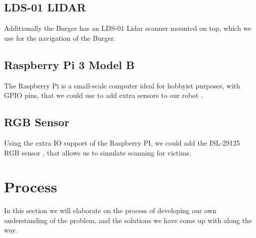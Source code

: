\documentclass[conference]{IEEEtran}
\begin{document}
\subsection{LDS-01 LIDAR}
Additionally the Burger has an LDS-01\cite{b2} Lidar scanner mounted on top, which we use for the navigation of the Burger.\\


\subsection{Raspberry Pi 3 Model B}
The Raspberry Pi is a small-scale computer ideal for hobbyist purposes, with GPIO pins, that we could use to add extra sensors to
our robot \cite{b3}.\\


\subsection{RGB Sensor}
Using the extra IO support of the Raspberry PI, we could add the ISL-29125 RGB sensor \cite{b4}, that allows us to simulate scanning for
victims.\\


\section{Process}
In this section we will elaborate on the process of developing our own understanding of the problem, and the solutions we have 
come up with along the way.\\
\end{document}
